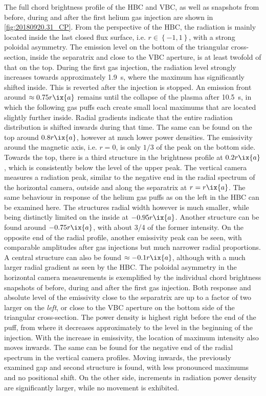             The full chord brightness profile of the HBC and VBC, as well as snapshots from before, during and after the first helium gas injection are shown in \cref{fig:20180920.31_CP}. From the perspective of the HBC, the radiation is mainly located inside the last closed flux surface, i.e. $r\in\left\{-1, 1\right\}$, with a strong poloidal asymmetry. The emission level on the bottom of the triangular cross-section, inside the separatrix and close to the VBC aperture, is at least twofold of that on the top. During the first gas injection, the radiation level strongly increases towards approximately \SI{1.9}{\second}, where the maximum has significantly shifted inside. This is reverted after the injection is stopped. An emission front around $\approx 0.75r\ix{a}$ remains until the collapse of the plasma after \SI{10.5}{\second}, in which the following gas puffs each create small local maximums that are located slightly further inside. Radial gradients indicate that the entire radiation distribution is shifted inwards during that time. The same can be found on the top around $0.8r\ix{a}$, however at much lower power densities. The emissivity around the magnetic axis, i.e. $r=0$, is only $1/3$ of the peak on the bottom side. Towards the top, there is a third structure in the brightness profile at $0.2r\ix{a}$, which is consistently below the level of the upper peak. The vertical camera measures a radiation peak, similar to the negative end in the radial spectrum of the horizontal camera, outside and along the separatrix at $r=r\ix{a}$. The same behaviour in response of the helium gas puffs as on the left in the HBC can be examined here. The structures radial width however is much smaller, while being distinctly limited on the inside at $-0.95r\ix{a}$. Another structure can be found around $-0.75r\ix{a}$, with about 3/4 of the former intensity. On the opposite end of the radial profile, another emissivity peak can be seen, with comparable amplitudes after gas injections but much narrower radial proportions. A central structure can also be found $\approx-0.1r\ix{a}$, although with a much larger radial gradient as seen by the HBC. The poloidal asymmetry in the horizontal camera measurements is exemplified by the individual chord brightness snapshots of before, during and after the first gas injection. Both response and absolute level of the emissivity close to the separatrix are up to a factor of two larger on the \textit{left}, or close to the VBC aperture on the bottom side of the triangular cross-section. The power density is highest right before the end of the puff, from where it decreases approximately to the level in the beginning of the injection. With the increase in emissivity, the location of maximum intensity also moves inwards. The same can be found for the negative end of the radial spectrum in the vertical camera profiles. Moving inwards, the previously examined gap and second structure is found, with less pronounced maximums and no positional shift. On the other side, increments in radiation power density are significantly larger, while no movement is exhibited.\\%

